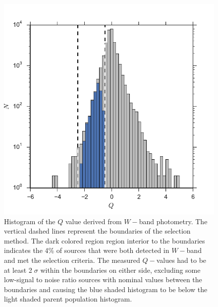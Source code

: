\begin{figure}[ht!]
	\caption{Histogram of the $Q$ value derived from $W-$band photometry.  The vertical dashed lines represent the boundaries of the selection method.  The dark colored region region interior to the boundaries indicates the 4\% of sources that were both detected in $W-$band and met the selection criteria.  The measured $Q-$values had to be at least 2$\;\sigma$ within the boundaries on either side, excluding some low-signal to noise ratio sources with nominal values between the boundaries and causing the blue shaded histogram to be below the light shaded parent population histogram.  \label{fig_Q_value_histogram}}
\centering
\includegraphics[scale=0.6]{chIMACS/figures/W_phot_sel_mgs}
\end{figure}

